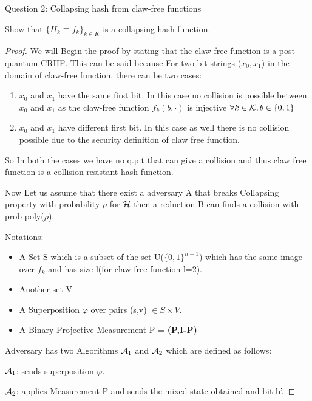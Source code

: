 \begin{solution}{Question 2: Collapsing hash from claw-free functions}\label{ques:x}
    \begin{question}
    Show that $\{H_k \equiv f_k\}_{k\in K}$ is a collapsing hash function.
    \end{question}
    \tcblower{}
    \begin{proof}
    We will Begin the proof by stating that the claw free function is a post-quantum CRHF. This can be said because For two bit-strings ($x_0,x_1$) in the domain of claw-free function, there can be two cases: \begin{enumerate}
        \item $x_0$ and $x_1$ have the same first bit. In this case no collision is possible between $x_0$ and $x_1$ as the claw-free function $f_k(b,\cdot)$ is injective $\forall k \in \mathcal{K}, b \in \{0,1\}$
        \item $x_0$ and $x_1$ have different first bit. In this case as well there is no collision possible due to the security definition of claw free function.
    \end{enumerate}

    So In both the cases we have no q.p.t that can give a collision and thus claw free function is a collision resistant hash function.

    Now Let us assume that there exist a adversary A that breaks Collapsing property with probability $\rho$ for $\mathcal{H}$ then a reduction B can finds a collision with prob poly($\rho$).

    Notations:
    \begin{itemize}
        \item A Set S which is a subset of the set U($\{0,1\}^{n+1}$) which has the same image over $f_k$ and has size l(for claw-free function l=2).
        \item Another set V
        \item A Superposition $\varphi$ over pairs (s,v) $\in S \times V$.
        \item A Binary Projective Measurement P = \textbf{(P,I-P)}
    \end{itemize}

    Adversary has two Algorithms $\mathcal{A}_1$ and $\mathcal{A}_2$ which are defined as follows:

    $\mathcal{A}_1$: sends superposition $\varphi$.

    $\mathcal{A}_2$: applies Measurement P and sends the mixed state obtained and bit b'.\newline


\end{proof}
\end{solution}
